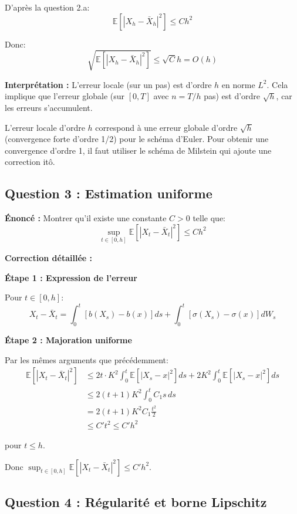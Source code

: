 \documentclass[12pt,a4paper]{article}
\theoremstyle{definition}
\newcommand{\E}{\mathbb{E}}
\begin{document}
D'après la question 2.a:
\[
\E[|X_h - \bar{X}_h|^2] \leq C h^2
\]

Donc:
\[
\sqrt{\E[|X_h - \bar{X}_h|^2]} \leq \sqrt{C} h = O(h)
\]

\textbf{Interprétation :} L'erreur locale (sur un pas) est d'ordre $h$ en norme $L^2$. Cela implique que l'erreur globale (sur $[0,T]$ avec $n = T/h$ pas) est d'ordre $\sqrt{h}$, car les erreurs s'accumulent.

\begin{astuce}
L'erreur locale d'ordre $h$ correspond à une erreur globale d'ordre $\sqrt{h}$ (convergence forte d'ordre 1/2) pour le schéma d'Euler. Pour obtenir une convergence d'ordre 1, il faut utiliser le schéma de Milstein qui ajoute une correction itô.
\end{astuce}

\subsection{Question 3 : Estimation uniforme}

\textbf{Énoncé :} Montrer qu'il existe une constante $C > 0$ telle que:
\[
\sup_{t \in [0,h]} \E[|X_t - \bar{X}_t|^2] \leq C h^2
\]

\textbf{Correction détaillée :}

\textbf{Étape 1 : Expression de l'erreur}

Pour $t \in [0, h]$:
\[
X_t - \bar{X}_t = \int_0^t [b(X_s) - b(x)] ds + \int_0^t [\sigma(X_s) - \sigma(x)] dW_s
\]

\textbf{Étape 2 : Majoration uniforme}

Par les mêmes arguments que précédemment:
\begin{align*}
\E[|X_t - \bar{X}_t|^2] &\leq 2t \cdot K^2 \int_0^t \E[|X_s - x|^2] ds + 2K^2 \int_0^t \E[|X_s - x|^2] ds \\
&\leq 2(t + 1) K^2 \int_0^t C_1 s \, ds \\
&= 2(t + 1) K^2 C_1 \frac{t^2}{2} \\
&\leq C' t^2 \leq C' h^2
\end{align*}

pour $t \leq h$.

Donc $\sup_{t \in [0,h]} \E[|X_t - \bar{X}_t|^2] \leq C' h^2$.

\subsection{Question 4 : Régularité et borne Lipschitz}
\end{document}
